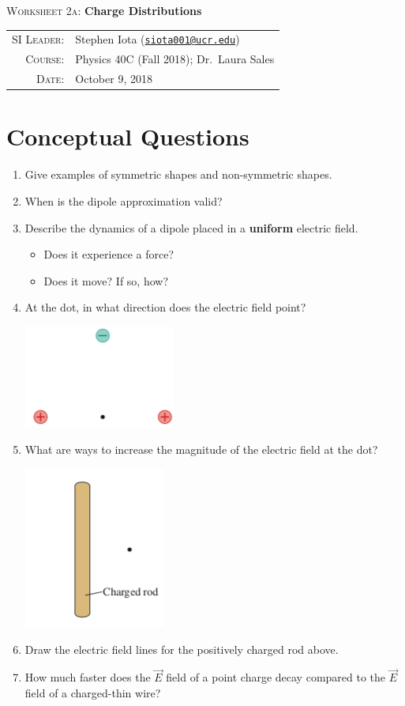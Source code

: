 \documentclass{article}
\newcommand{\email}[1]{\texttt{\href{mailto:#1}{#1}}}
\begin{document}
\begin{center}

\Large{\textsc{Worksheet 2a}: \textbf{Charge Distributions}}

\end{center}

\vspace{.5mm}


\begin{tabular}{rl}
\textsc{SI Leader}:
&
Stephen Iota (\email{siota001@ucr.edu})
\\
\textsc{Course}:
&
Physics 40C (Fall 2018); Dr.~Laura Sales
\\
\textsc{Date}:
&
October 9, 2018
\end{tabular}



\section{Conceptual Questions}

\begin{enumerate}[label=(\alph*)]
\item Give examples of symmetric shapes and non-symmetric shapes.
\item When is the dipole approximation valid?
\item Describe the dynamics of a dipole placed in a \textbf{uniform} electric field.
\begin{itemize}
	\item Does it experience a force?
	\item Does it move? If so, how?
\end{itemize}
\item At the dot, in what direction does the electric field point?
 
\includegraphics[width=.2\linewidth]{W2a_Fig1.png}
\item What are ways to increase the magnitude of the electric field at the dot?

\includegraphics[width=.2\linewidth]{W2a_Fig2}
\item Draw the electric field lines for the positively charged rod above.
\item How much faster does the $\vec{E}$ field of a point charge decay compared to the $\vec{E}$ field of a charged-thin wire?
\end{enumerate}
\end{document}
